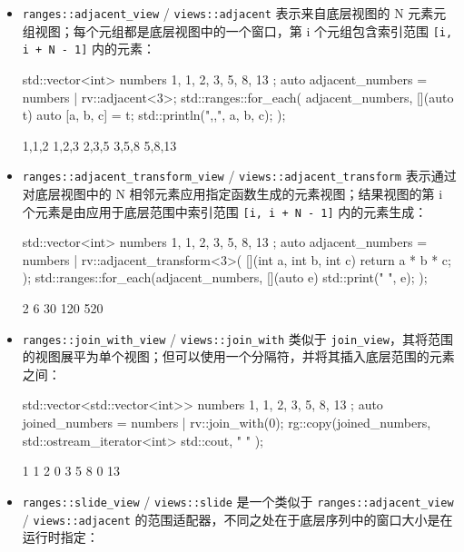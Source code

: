 \begin{itemize}
\item
\verb|ranges::adjacent_view| / \verb|views::adjacent| 表示来自底层视图的 N 元素元组视图；每个元组都是底层视图中的一个窗口，第 i 个元组包含索引范围 \verb|[i, i + N - 1]| 内的元素：

\begin{cpp}
std::vector<int> numbers{ 1, 1, 2, 3, 5, 8, 13 };
auto adjacent_numbers = numbers | rv::adjacent<3>;
    std::ranges::for_each(
    adjacent_numbers,
    [](auto t) {
        auto [a, b, c] = t;
        std::println("{},{},{}", a, b, c);
    });
\end{cpp}

\begin{shell}
1,1,2
1,2,3
2,3,5
3,5,8
5,8,13
\end{shell}

\item
\verb|ranges::adjacent_transform_view| / \verb|views::adjacent_transform| 表示通过对底层视图中的 N 相邻元素应用指定函数生成的元素视图；结果视图的第 i 个元素是由应用于底层范围中索引范围 \verb|[i, i + N - 1]| 内的元素生成：

\begin{cpp}
std::vector<int> numbers{ 1, 1, 2, 3, 5, 8, 13 };
auto adjacent_numbers =
    numbers |
    rv::adjacent_transform<3>(
        [](int a, int b, int c) {return a * b * c; });
std::ranges::for_each(adjacent_numbers,
                      [](auto e) {std::print("{} ", e); });
\end{cpp}

\begin{shell}
2 6 30 120 520
\end{shell}

\item
\verb|ranges::join_with_view| / \verb|views::join_with| 类似于 \verb|join_view|，其将范围的视图展平为单个视图；但可以使用一个分隔符，并将其插入底层范围的元素之间：

\begin{cpp}
std::vector<std::vector<int>> numbers{ {1, 1, 2}, {3, 5, 8},
                                       {13} };
auto joined_numbers = numbers | rv::join_with(0);
rg::copy(joined_numbers,
         std::ostream_iterator<int>{ std::cout, " " });
\end{cpp}

\begin{shell}
1 1 2 0 3 5 8 0 13
\end{shell}

\item
\verb|ranges::slide_view| / \verb|views::slide| 是一个类似于 \verb|ranges::adjacent_view| / \verb|views::adjacent| 的范围适配器，不同之处在于底层序列中的窗口大小是在运行时指定：


\end{itemize}
